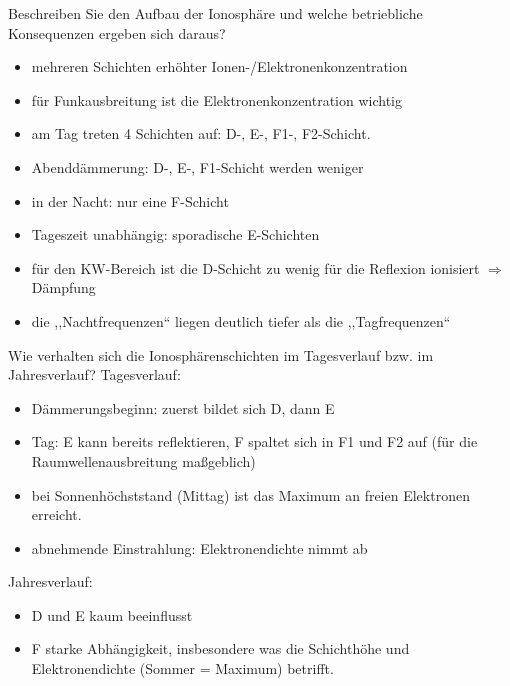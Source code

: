 \documentclass[avery5371,grid,frame,a4paper]{flashcards}
\newcommand{\card}[3]{
  \begin{flashcard}[{\chap} -- #1]{#2}#3\end{flashcard}
}
\begin{document}
\card{21}{Beschreiben Sie den Aufbau der Ionosphäre und welche betriebliche Konsequenzen ergeben sich daraus?}{
  \footnotesize
  \begin{minipage}{0.49\textwidth}
    \begin{itemize}
      \item mehreren Schichten erhöhter Ionen-/Elektronenkonzentration
      \item für Funkausbreitung ist die Elektronenkonzentration wichtig
      \item am Tag treten 4 Schichten auf: D-, E-, F1-, F2-Schicht.
      \item Abenddämmerung: D-, E-, F1-Schicht werden weniger
    \end{itemize}
  \end{minipage}
  \begin{minipage}{0.5\textwidth}
    \begin{itemize}
      \item in der Nacht: nur eine F-Schicht
      \item Tageszeit unabhängig: sporadische E-Schichten
      \item für den KW-Bereich ist die D-Schicht zu wenig für die Reflexion ionisiert $\Rightarrow$ Dämpfung
      \item die ,,Nachtfrequenzen`` liegen deutlich tiefer als die ,,Tagfrequenzen``
    \end{itemize}
  \end{minipage}
}
\card{22}{Wie verhalten sich die Ionosphärenschichten im Tagesverlauf bzw. im Jahresverlauf?}{
  \footnotesize
  Tagesverlauf:
  \begin{itemize}\itemsep0pt
    \item Dämmerungsbeginn: zuerst bildet sich D, dann E
    \item Tag: E kann bereits reflektieren, F spaltet sich in F1 und F2  auf (für die Raumwellenausbreitung maßgeblich)
    \item bei Sonnenhöchststand (Mittag) ist das Maximum an freien Elektronen erreicht.
    \item abnehmende Einstrahlung: Elektronendichte nimmt ab
  \end{itemize}

  Jahresverlauf:
  \begin{itemize}\itemsep0pt
    \item D und E kaum beeinflusst
    \item F starke Abhängigkeit, insbesondere was die Schichthöhe und Elektronendichte (Sommer = Maximum) betrifft.
  \end{itemize}
}
\end{document}
